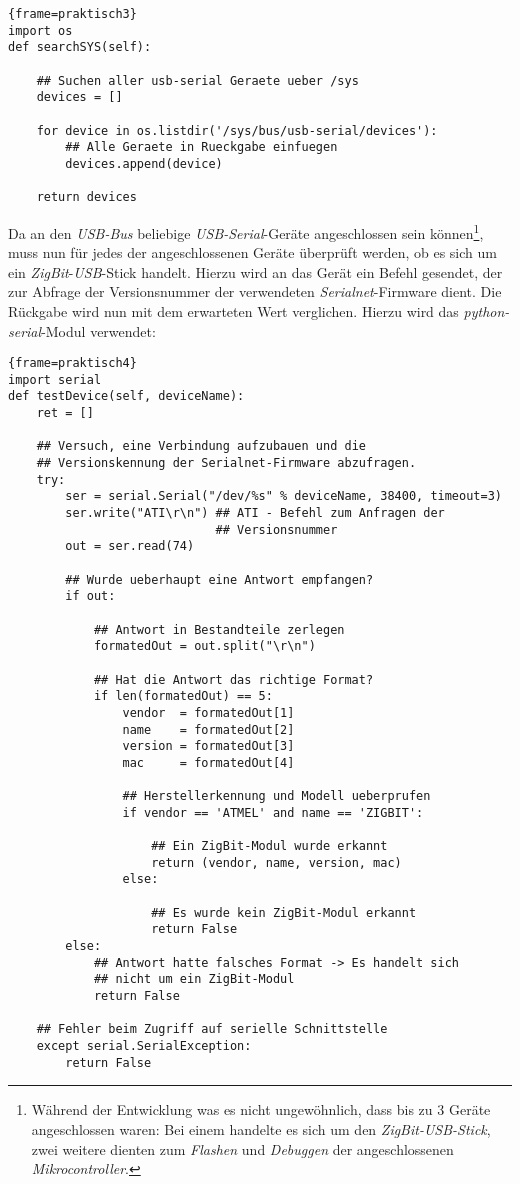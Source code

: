 \begin{lstlisting}{frame=praktisch3}
import os
def searchSYS(self):

    ## Suchen aller usb-serial Geraete ueber /sys 
    devices = []

    for device in os.listdir('/sys/bus/usb-serial/devices'):
        ## Alle Geraete in Rueckgabe einfuegen
        devices.append(device)

    return devices
\end{lstlisting}

Da an den \emph{USB-Bus} beliebige \emph{USB-Serial}-Geräte angeschlossen sein können\footnote{Während der Entwicklung
was es nicht ungewöhnlich, dass bis zu 3 Geräte angeschlossen waren: Bei einem handelte es sich um den
\emph{ZigBit-USB-Stick}, zwei weitere dienten zum \emph{Flashen} und \emph{Debuggen} der angeschlossenen 
\emph{Mikrocontroller}.}, 
muss nun für jedes der angeschlossenen Geräte überprüft werden, ob es sich um ein \emph{ZigBit}-\emph{USB}-Stick
handelt. Hierzu wird an das Gerät ein Befehl gesendet, der zur Abfrage der Versionsnummer der verwendeten
\emph{Serialnet}-Firmware dient. Die Rückgabe wird nun mit dem erwarteten Wert verglichen. Hierzu wird das
\emph{python-serial}-Modul verwendet:

\begin{lstlisting}{frame=praktisch4}
import serial
def testDevice(self, deviceName):
    ret = []

    ## Versuch, eine Verbindung aufzubauen und die 
    ## Versionskennung der Serialnet-Firmware abzufragen. 
    try:
        ser = serial.Serial("/dev/%s" % deviceName, 38400, timeout=3)
        ser.write("ATI\r\n") ## ATI - Befehl zum Anfragen der
                             ## Versionsnummer
        out = ser.read(74)
        
        ## Wurde ueberhaupt eine Antwort empfangen? 
        if out:

            ## Antwort in Bestandteile zerlegen
            formatedOut = out.split("\r\n")

            ## Hat die Antwort das richtige Format?
            if len(formatedOut) == 5:
                vendor  = formatedOut[1]
                name    = formatedOut[2]
                version = formatedOut[3]
                mac     = formatedOut[4]

                ## Herstellerkennung und Modell ueberprufen
                if vendor == 'ATMEL' and name == 'ZIGBIT':

                    ## Ein ZigBit-Modul wurde erkannt
                    return (vendor, name, version, mac)
                else:

                    ## Es wurde kein ZigBit-Modul erkannt
                    return False
        else:
            ## Antwort hatte falsches Format -> Es handelt sich
            ## nicht um ein ZigBit-Modul
            return False

    ## Fehler beim Zugriff auf serielle Schnittstelle
    except serial.SerialException:
        return False
\end{lstlisting}

